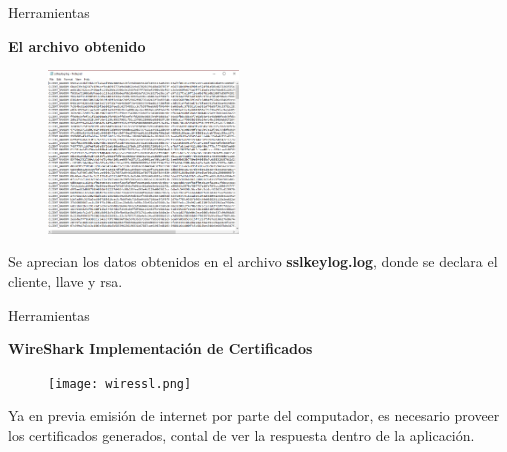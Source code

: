 \begin{frame}[t,fragile]{Herramientas}

\textbf{El archivo obtenido}

\begin{figure} 
\vspace{2pt}
  \begin{center}
    \includegraphics[width=0.45\textwidth]{ssllog.png}
    \label{fig:databaseUserTable}
  \end{center}
  \vspace{2pt}
\end{figure} 

\bigskip

Se aprecian los datos obtenidos en el archivo \textbf{sslkeylog.log}, donde se declara el cliente, llave y rsa.

\begin{center}
   
\end{center}

\end{frame}

\begin{frame}[t,fragile]{Herramientas}

\textbf{WireShark Implementación de Certificados}

\begin{figure} 
\vspace{2pt}
  \begin{center}
    \texttt{[image: wiressl.png]}
    \label{fig:databaseUserTable}
  \end{center}
  \vspace{2pt}
\end{figure} 

\bigskip

Ya en previa emisión de internet por parte del computador, es necesario proveer los certificados generados, contal de ver la respuesta dentro de la aplicación.

\begin{center}
   
\end{center}

\end{frame}

